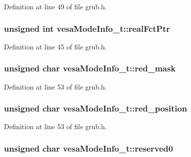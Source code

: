 Definition at line 49 of file grub.\+h.

\hypertarget{structvesaModeInfo__t_a3c3c1fa91bfb8ec58a80ff0b9c1deaae}{
\subsubsection[{real\+Fct\+Ptr}]{\setlength{\rightskip}{0pt plus 5cm}unsigned int vesa\+Mode\+Info\+\_\+t\+::real\+Fct\+Ptr}}\label{structvesaModeInfo__t_a3c3c1fa91bfb8ec58a80ff0b9c1deaae}


Definition at line 45 of file grub.\+h.

\hypertarget{structvesaModeInfo__t_a653392718e3a3c21aad77d0236ec8929}{
\subsubsection[{red\+\_\+mask}]{\setlength{\rightskip}{0pt plus 5cm}unsigned char vesa\+Mode\+Info\+\_\+t\+::red\+\_\+mask}}\label{structvesaModeInfo__t_a653392718e3a3c21aad77d0236ec8929}


Definition at line 53 of file grub.\+h.

\hypertarget{structvesaModeInfo__t_a96ecd4368bbcf68b97c9496939069c55}{
\subsubsection[{red\+\_\+position}]{\setlength{\rightskip}{0pt plus 5cm}unsigned char vesa\+Mode\+Info\+\_\+t\+::red\+\_\+position}}\label{structvesaModeInfo__t_a96ecd4368bbcf68b97c9496939069c55}


Definition at line 53 of file grub.\+h.

\hypertarget{structvesaModeInfo__t_a0f912afd0a853ea123ad3a157fc579c9}{
\subsubsection[{reserved0}]{\setlength{\rightskip}{0pt plus 5cm}unsigned char vesa\+Mode\+Info\+\_\+t\+::reserved0}}\label{structvesaModeInfo__t_a0f912afd0a853ea123ad3a157fc579c9}


